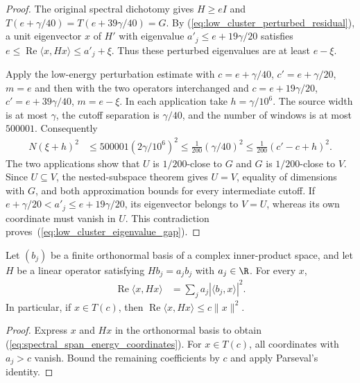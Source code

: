 \begin{proof}
    \leanok
    The original spectral dichotomy gives $H\ge eI$ and
    $T(e+\gamma/40)=T(e+39\gamma/40)=G$. By
    (\ref{eq:low_cluster_perturbed_residual}), a unit eigenvector $x$ of
    $H'$ with eigenvalue $a'_j\le e+19\gamma/20$ satisfies
    $e\le\operatorname{Re}\langle x,Hx\rangle\le a'_j+\xi$.
    Thus these perturbed eigenvalues are at least $e-\xi$.

    Apply the low-energy perturbation estimate with
    $c=e+\gamma/40$, $c'=e+\gamma/20$, $m=e$ and then with the two
    operators interchanged and
    $c=e+19\gamma/20$, $c'=e+39\gamma/40$, $m=e-\xi$.
    In each application take $h=\gamma/10^6$. The source width is at
    most $\gamma$, the cutoff separation is $\gamma/40$, and the number
    of windows is at most $500001$. Consequently
    \begin{align}
        N(\xi+h)^2
         & \le 500001(2\gamma/10^6)^2
        \le \frac1{200}(\gamma/40)^2
        \le \frac1{200}(c'-c+h)^2.
        \label{eq:low_cluster_window_bound}
    \end{align}
    The two applications show that $U$ is $1/200$-close to $G$ and $G$
    is $1/200$-close to $V$. Since $U\subseteq V$, the nested-subspace
    theorem gives $U=V$, equality of dimensions with $G$, and both
    approximation bounds for every intermediate cutoff. If
    $e+\gamma/20<a'_j\le e+19\gamma/20$, its eigenvector belongs to
    $V=U$, whereas its own coordinate must vanish in $U$. This
    contradiction proves~(\ref{eq:low_cluster_eigenvalue_gap}).
\end{proof}


\begin{theorem}
    \label{thm:spectral_span_quadratic_form}
    \leanok
    Let $(b_j)$ be a finite orthonormal basis of a complex inner-product
    space, and let $H$ be a linear operator satisfying $Hb_j=a_jb_j$ with
    $a_j\in\R$. For every $x$,
    \begin{align}
        \operatorname{Re}\langle x,Hx\rangle
         & =\sum_j a_j|\langle b_j,x\rangle|^2.
        \label{eq:spectral_span_energy_coordinates}
    \end{align}
    In particular, if $x\in T(c)$, then
    $\operatorname{Re}\langle x,Hx\rangle\le c\|x\|^2$.
\end{theorem}
\begin{proof}
    \leanok
    Express $x$ and $Hx$ in the orthonormal basis to obtain
    (\ref{eq:spectral_span_energy_coordinates}). For $x\in T(c)$, all
    coordinates with $a_j>c$ vanish. Bound the remaining coefficients by
    $c$ and apply Parseval's identity.
\end{proof}

